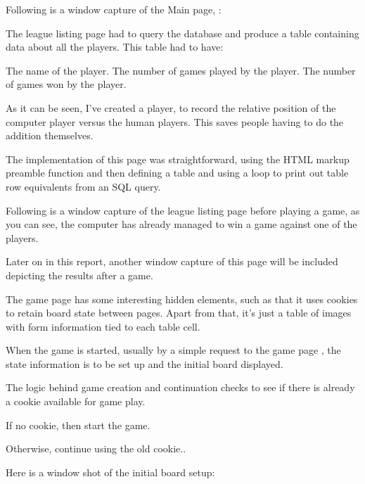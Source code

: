 
\subitems	Following is a window capture of the Main page, :



\items	The league listing page had to query the database and produce a table containing data about all the players. This table had to have:

\subitems	The name of the player.
\subitems	The number of games played by the player.
\subitems	The number of games won by the player.

\items	As it can be seen, I've created a  player, to record the relative position of the computer player versus the human players. This saves people having to do the addition themselves.

\items	The implementation of this page was straightforward, using the HTML markup preamble function and then defining a table and using a loop to print out table row equivalents from an SQL query.


\subitems	Following is a window capture of the league listing page before playing a game, as you can see, the computer has already managed to win a game against one of the players.


\subitems	Later on in this report, another window capture of this page will be included depicting the results after a game.


\items	The game page has some interesting hidden elements, such as that it uses cookies to retain board state between pages. Apart from that, it's just a table of images with form information tied to each table cell.

\items	When the game is started, usually by a simple  request to the game page , the state information is to be set up and the initial board displayed.

\items	The logic behind game creation and continuation checks to see if there is already a cookie available for game play.

\subitems	If no cookie, then start the game.

\subitems	Otherwise, continue using the old cookie..

\subitems	Here is a window shot of the initial board setup:

